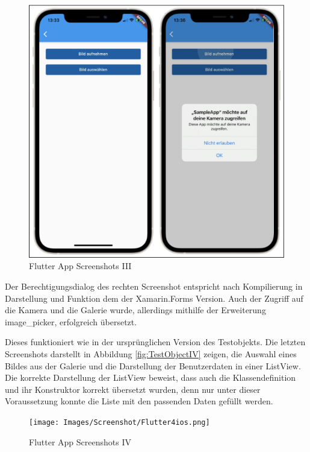   
\begin{figure}[!ht]
 \includegraphics[width=\textwidth,keepaspectratio]{Images/Screenshot/Flutter3ios.png}
 \caption{Flutter App Screenshots III}
 \label{fig:FlutterAppIII}
\end{figure}
Der Berechtigungsdialog des rechten Screenshot entspricht nach Kompilierung in Darstellung und 
Funktion dem der Xamarin.Forms Version.  Auch der Zugriff auf die Kamera und die Galerie wurde, allerdings mithilfe der Erweiterung image\_picker, erfolgreich übersetzt.

Dieses funktioniert wie in der ursprünglichen Version des Testobjekts.  Die letzten Screenshots darstellt in Abbildung \ref{fig:TestObjectIV} zeigen,  die Auswahl eines Bildes aus der Galerie und die Darstellung der Benutzerdaten in einer ListView.  Die korrekte Darstellung der ListView beweist, dass auch die Klassendefinition und ihr
Konstruktor korrekt übersetzt wurden, denn nur unter dieser Voraussetzung konnte die Liste mit den 
passenden Daten gefüllt werden.

 
  
\begin{figure}[!ht]
 \texttt{[image: Images/Screenshot/Flutter4ios.png]}
 \caption{Flutter App Screenshots IV}
 \label{fig:FlutterAppIV}
\end{figure}

